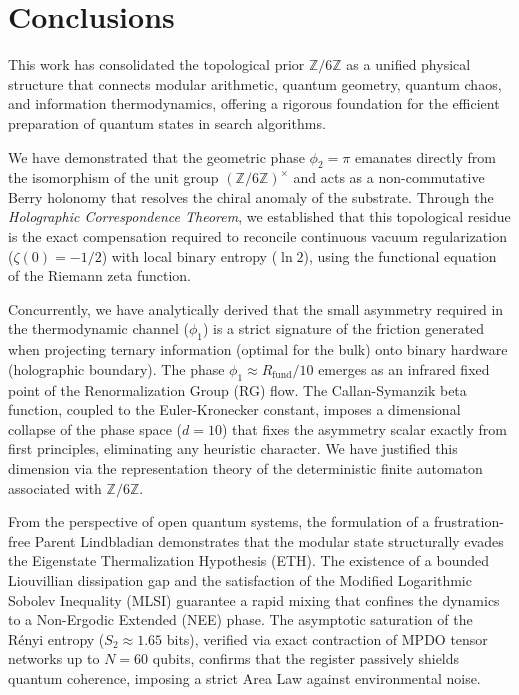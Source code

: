 \documentclass[12pt,a4paper]{article}
\theoremstyle{plain}
\theoremstyle{definition}
\theoremstyle{remark}
\begin{document}
\section{Conclusions}
\label{sec:conclusiones}

This work has consolidated the topological prior $\mathbb{Z}/6\mathbb{Z}$ as a unified physical structure that connects modular arithmetic, quantum geometry, quantum chaos, and information thermodynamics, offering a rigorous foundation for the efficient preparation of quantum states in search algorithms.

We have demonstrated that the geometric phase $\phi_2 = \pi$ emanates directly from the isomorphism of the unit group $(\mathbb{Z}/6\mathbb{Z})^{\times}$ and acts as a non-commutative Berry holonomy that resolves the chiral anomaly of the substrate. Through the \textit{Holographic Correspondence Theorem}, we established that this topological residue is the exact compensation required to reconcile continuous vacuum regularization ($\zeta(0) = -1/2$) with local binary entropy ($\ln 2$), using the functional equation of the Riemann zeta function.

Concurrently, we have analytically derived that the small asymmetry required in the thermodynamic channel ($\phi_1$) is a strict signature of the friction generated when projecting ternary information (optimal for the bulk) onto binary hardware (holographic boundary). The phase $\phi_1 \approx R_{\text{fund}}/10$ emerges as an infrared fixed point of the Renormalization Group (RG) flow. The Callan-Symanzik beta function, coupled to the Euler-Kronecker constant, imposes a dimensional collapse of the phase space ($d=10$) that fixes the asymmetry scalar exactly from first principles, eliminating any heuristic character. We have justified this dimension via the representation theory of the deterministic finite automaton associated with $\mathbb{Z}/6\mathbb{Z}$.

From the perspective of open quantum systems, the formulation of a frustration-free Parent Lindbladian demonstrates that the modular state structurally evades the Eigenstate Thermalization Hypothesis (ETH). The existence of a bounded Liouvillian dissipation gap and the satisfaction of the Modified Logarithmic Sobolev Inequality (MLSI) guarantee a rapid mixing that confines the dynamics to a Non-Ergodic Extended (NEE) phase. The asymptotic saturation of the Rényi entropy ($S_2 \approx 1.65$ bits), verified via exact contraction of MPDO tensor networks up to $N=60$ qubits, confirms that the register passively shields quantum coherence, imposing a strict Area Law against environmental noise.
\end{document}
